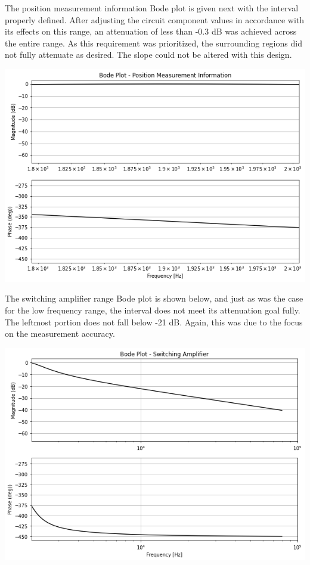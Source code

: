 \documentclass[12pt]{report}
\begin{document}
The position measurement information Bode plot is given next with the interval properly defined. After adjusting the circuit component values in accordance with its effects on this range, an attenuation of less than -0.3 dB was achieved across the entire range. As this requirement was prioritized, the surrounding regions did not fully attenuate as desired. The slope could not be altered with this design. \\

\begin{center}
	\includegraphics[scale = 0.46]{Lab 12 - Plots/Bode2.png}\\[0.5 cm]
\end{center}

The switching amplifier range Bode plot is shown below, and just as was the case for the low frequency range, the interval does not meet its attenuation goal fully. The leftmost portion does not fall below -21 dB. Again, this was due to the focus on the measurement accuracy.

\begin{center}
	\includegraphics[scale = 0.46]{Lab 12 - Plots/Bode3.png}\\[1.0 cm]
\end{center}
\end{document}
